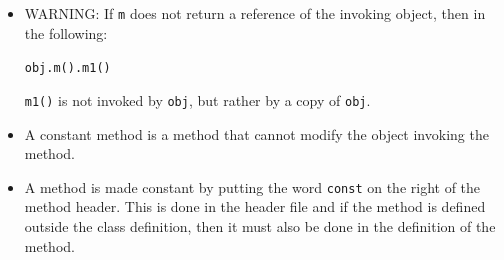 \begin{itemize}
\item WARNING: If \texttt{m} does not return a reference of the invoking
  object, then in the following:

\texttt{obj.m().m1()}

  \texttt{m1()} is not invoked by \texttt{obj}, but rather by a copy of
  \texttt{obj}.

\item A constant method is a method that cannot modify the object invoking
  the method.

\item A method is made constant by putting the word \texttt{const} on the
  right of the method header. This is done in the header file and if the
  method is defined outside the class definition, then it must also be
  done in the definition of the method.
\end{itemize}


